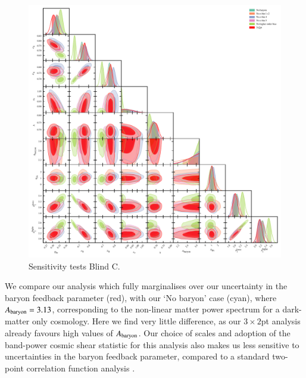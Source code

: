 \begin{appendix}
\begin{figure}
	\begin{center}
		\includegraphics[width=\textwidth]{Parameter_Plots/systematics/blind_C_EE_nE_w_systematics_chains}
		\caption{Sensitivity tests Blind C. }
		\label{fig:sensitivity_tests}
	\end{center}
\end{figure}

We compare our analysis which fully marginalises over our uncertainty in the baryon feedback parameter (red), with our `No baryon' case (cyan), where $A_{\rm baryon}=3.13$, corresponding to the non-linear matter power spectrum for a dark-matter only cosmology.   Here we find very little difference, as our $3\times2$pt analysis already favours high values of $A_{\rm baryon}$.   Our choice of scales and adoption of the band-power cosmic shear statistic for this analysis also makes us less sensitive to uncertainties in the baryon feedback parameter, compared to a standard two-point correlation function analysis \citep{asgari/etal:2020_KD}.


\end{appendix}
